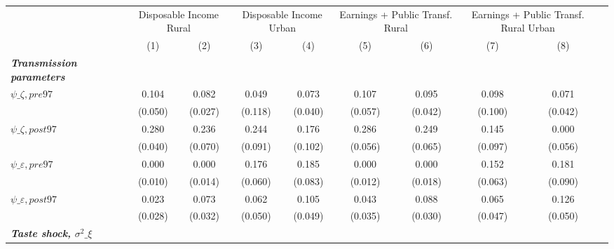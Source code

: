 \begin{tabular}{l*{10}{c}} \toprule
                    &            &\multicolumn{2}{c}{Disposable Income Rural}&\multicolumn{2}{c}{Disposable Income Urban}&\multicolumn{2}{c}{Earnings + Public Transf. Rural}&\multicolumn{2}{c}{Earnings + Public Transf. Rural Urban}\\\cmidrule{3-4}\cmidrule{5-6}\cmidrule{7-8}\cmidrule{9-10}
                    &            &\multicolumn{1}{c}{(1)}&\multicolumn{1}{c}{(2)}&\multicolumn{1}{c}{(3)}&\multicolumn{1}{c}{(4)}&\multicolumn{1}{c}{(5)}&\multicolumn{1}{c}{(6)}&\multicolumn{1}{c}{(7)}&\multicolumn{1}{c}{(8)}\\
\midrule
\textbf{\emph{Transmission parameters}}&            &            &            &            &            &            &            &            &            \\
\hspace{.3cm} $\psi\_{\zeta,pre97}$&            &       0.104&       0.082&       0.049&       0.073&       0.107&       0.095&       0.098&       0.071\\
                    &            &     (0.050)&     (0.027)&     (0.118)&     (0.040)&     (0.057)&     (0.042)&     (0.100)&     (0.042)\\
\hspace{.3cm} $\psi\_{\zeta,post97}$&            &       0.280&       0.236&       0.244&       0.176&       0.286&       0.249&       0.145&       0.000\\
                    &            &     (0.040)&     (0.070)&     (0.091)&     (0.102)&     (0.056)&     (0.065)&     (0.097)&     (0.056)\\
\hspace{.3cm} $\psi\_{\varepsilon,pre97}$&            &       0.000&       0.000&       0.176&       0.185&       0.000&       0.000&       0.152&       0.181\\
                    &            &     (0.010)&     (0.014)&     (0.060)&     (0.083)&     (0.012)&     (0.018)&     (0.063)&     (0.090)\\
\hspace{.3cm} $\psi\_{\varepsilon,post97}$&            &       0.023&       0.073&       0.062&       0.105&       0.043&       0.088&       0.065&       0.126\\
                    &            &     (0.028)&     (0.032)&     (0.050)&     (0.049)&     (0.035)&     (0.030)&     (0.047)&     (0.050)\\
\textbf{\emph{Taste shock, $\sigma^2\_{\xi}$}}&            &            &            &            &            &            &            &            &            \\

\end{tabular}
